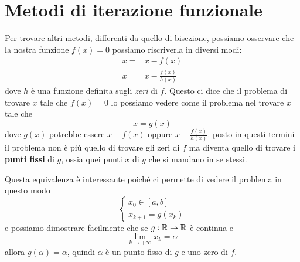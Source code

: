\section{Metodi di iterazione funzionale}

Per trovare altri metodi, differenti da quello di bisezione, possiamo osservare
che la nostra funzione $f(x) = 0$ possiamo riscriverla in diversi modi:
\begin{align*}
	x = & x - f(x)              \\
	x = & x - \frac{f(x)}{h(x)}
\end{align*}
dove $h$ è una funzione definita sugli \emph{zeri} di $f$. Questo ci dice che il
problema di trovare $x$ tale che $f(x) = 0$ lo possiamo vedere come il problema
nel trovare $x$ tale che
\[ x = g(x) \]
dove $g(x)$ potrebbe essere $x - f(x)$ oppure $x - \frac{f(x)}{h(x)}$. posto in
questi termini il problema non è più quello di trovare gli zeri di $f$ ma
diventa quello di trovare i \textbf{punti fissi} di $g$, ossia quei punti $x$ di
$g$ che si mandano in se stessi.

Questa equivalenza è interessante poiché ci permette di vedere il problema in
questo modo
\[
	\begin{cases}
		x_0 \in [a, b] \\
		x_{k+1} = g(x_k)
	\end{cases}
\]
e possiamo dimostrare facilmente che se $g : \mathbb{R} \to \mathbb{R}$ è continua e
\[ \lim_{k \to +\infty} x_{k} = \alpha \]
allora $g(\alpha) = \alpha$, quindi $\alpha$ è un punto fisso di $g$ e uno zero
di $f$.

